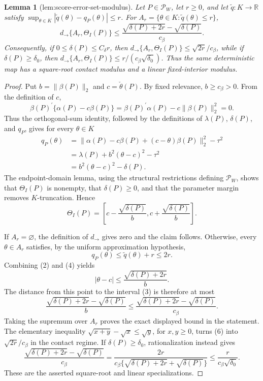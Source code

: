 \documentclass{article}
\newtheorem{lemma}{Lemma}
\begin{document}
\begin{lemma}[lem:score-error-set-modulus]\label{lem:score-error-set-modulus}
Let \(P\in\mathcal P_W\), let \(r\geq0\), and let \(\widetilde q:K\to\mathbb R\) satisfy \(\sup_{\theta\in K}|\widetilde q(\theta)-q_P(\theta)|\leq r\). For \(A_r=\{\theta\in K:\widetilde q(\theta)\leq r\}\),
\[
 d_{\to}\{A_r,\Theta_I(P)\}
 \leq \frac{\sqrt{\delta(P)+2r}-\sqrt{\delta(P)}}{c_\beta}. \tag{1}
\]
Consequently, if \(0\leq\delta(P)\leq C_\delta r\), then \(d_{\to}\{A_r,\Theta_I(P)\}\leq \sqrt{2r}/c_\beta\), while if \(\delta(P)\geq\delta_0\), then \(d_{\to}\{A_r,\Theta_I(P)\}\leq r/(c_\beta\sqrt{\delta_0})\). Thus the same deterministic map has a square-root contact modulus and a linear fixed-interior modulus.
\end{lemma}
\begin{proof}
Put \(b=\|\beta(P)\|_2\) and \(c=\check\theta(P)\). By fixed relevance, \(b\geq c_\beta>0\). From the definition of \(c\),
\[
 \beta(P)^{\prime}\{\alpha(P)-c\beta(P)\}
 =\beta(P)^{\prime}\alpha(P)-c\|\beta(P)\|_2^2=0. \tag{1}
\]
Thus the orthogonal-sum identity, followed by the definitions of \(\lambda(P)\), \(\delta(P)\), and \(q_P\), gives for every \(\theta\in K\)
\[
 \begin{aligned}
 q_P(\theta)
 &=\|\alpha(P)-c\beta(P)+(c-\theta)\beta(P)\|_2^2-\tau^2\\
 &=\lambda(P)+b^2(\theta-c)^2-\tau^2\\
 &=b^2(\theta-c)^2-\delta(P). \tag{2}
 \end{aligned}
\]
The endpoint-domain lemma, using the structural restrictions defining \(\mathcal P_W\), shows that \(\Theta_I(P)\) is nonempty, that \(\delta(P)\geq0\), and that the parameter margin removes \(K\)-truncation. Hence
\[
 \Theta_I(P)=\left[c-\frac{\sqrt{\delta(P)}}b,
 c+\frac{\sqrt{\delta(P)}}b\right]. \tag{3}
\]

If \(A_r=\varnothing\), the definition of \(d_{\to}\) gives zero and the claim follows. Otherwise, every \(\theta\in A_r\) satisfies, by the uniform approximation hypothesis,
\[
 q_P(\theta)\leq\widetilde q(\theta)+r\leq2r. \tag{4}
\]
Combining (2) and (4) yields
\[
 |\theta-c|\leq\frac{\sqrt{\delta(P)+2r}}b. \tag{5}
\]
The distance from this point to the interval (3) is therefore at most
\[
 \frac{\sqrt{\delta(P)+2r}-\sqrt{\delta(P)}}b
 \leq
 \frac{\sqrt{\delta(P)+2r}-\sqrt{\delta(P)}}{c_\beta}. \tag{6}
\]
Taking the supremum over \(A_r\) proves the exact displayed bound in the statement. The elementary inequality \(\sqrt{x+y}-\sqrt x\leq\sqrt y\), for \(x,y\geq0\), turns (6) into \(\sqrt{2r}/c_\beta\) in the contact regime. If \(\delta(P)\geq\delta_0\), rationalization instead gives
\[
 \frac{\sqrt{\delta(P)+2r}-\sqrt{\delta(P)}}{c_\beta}
 =\frac{2r}{c_\beta\{\sqrt{\delta(P)+2r}+\sqrt{\delta(P)}\}}
 \leq\frac{r}{c_\beta\sqrt{\delta_0}}. \tag{7}
\]
These are the asserted square-root and linear specializations.
\end{proof}
\end{document}

